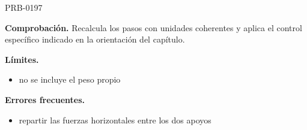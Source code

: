 \begin{studiumworked}{PRB-0197}
\par\textbf{Comprobación.} Recalcula los pasos con unidades coherentes y aplica el control específico indicado en la orientación del capítulo.

\textbf{Límites.}\begin{itemize}\item no se incluye el peso propio\end{itemize}

\textbf{Errores frecuentes.}\begin{itemize}\item repartir las fuerzas horizontales entre los dos apoyos\end{itemize}

\end{studiumworked}

\Needspace{.3\textheight}

